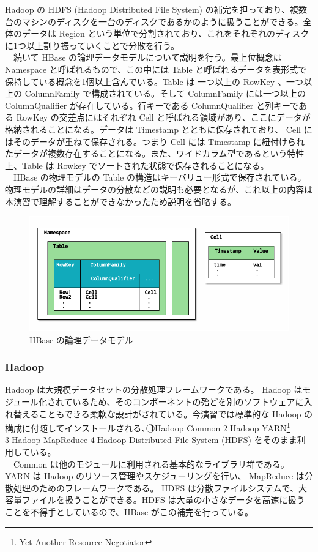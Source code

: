 \documentclass{scrartcl}
\begin{document}
Hadoop の HDFS (Hadoop Distributed File System) の補完を担っており、複数台のマシンのディスクを一台のディスクであるかのように扱うことができる。全体のデータは Region という単位で分割されており、これをそれぞれのディスクに1つ以上割り振っていくことで分散を行う。\\
　続いて HBase の論理データモデルについて説明を行う。最上位概念は Namespace と呼ばれるもので、この中には Table と呼ばれるデータを表形式で保持している概念を1個以上含んでいる。Table は 一つ以上の RowKey 、一つ以上の ColumnFamily で構成されている。そして ColumnFamily には一つ以上の ColumnQualifier が存在している。行キーである ColumnQualifier と列キーである RowKey の交差点にはそれぞれ Cell と呼ばれる領域があり、ここにデータが格納されることになる。データは Timestamp とともに保存されており、 Cell にはそのデータが重ねて保存される。つまり Cell には Timestamp に紐付けられたデータが複数存在することになる。また、ワイドカラム型であるという特性上、Table は Rowkey でソートされた状態で保存されることになる。\\
　HBase の物理モデルの Table の構造はキーバリュー形式で保存されている。物理モデルの詳細はデータの分散などの説明も必要となるが、これ以上の内容は本演習で理解することができなかったため説明を省略する。\\

\begin{figure}[htbp]
\centering
\includegraphics[width=.9\linewidth]{hoge2.png}
\caption{HBase の論理データモデル}
\end{figure}

\subsubsection{Hadoop}
\label{sec:orga922a28}
Hadoop は大規模データセットの分散処理フレームワークである。 Hadoop はモジュール化されているため、そのコンポーネントの殆どを別のソフトウェアに入れ替えることもできる柔軟な設計がされている。今演習では標準的な Hadoop の構成に付随してインストールされる、\textcircled{\scriptsize 1}Hadoop Common \textcircled{\scriptsize 2}Hadoop YARN\footnote{Yet Another Resource Negotiator} \textcircled{\scriptsize 3}Hadoop MapReduce \textcircled{\scriptsize 4}Hadoop Distributed File System (HDFS) をそのまま利用している。\\
　Common は他のモジュールに利用される基本的なライブラリ群である。 YARN は Hadoop のリソース管理やスケジューリングを行い、 MapReduce は分散処理のためのフレームワークである。 HDFS は分散ファイルシステムで、大容量ファイルを扱うことができる。HDFS は大量の小さなデータを高速に扱うことを不得手としているので、HBase がこの補完を行っている。\\
\end{document}
